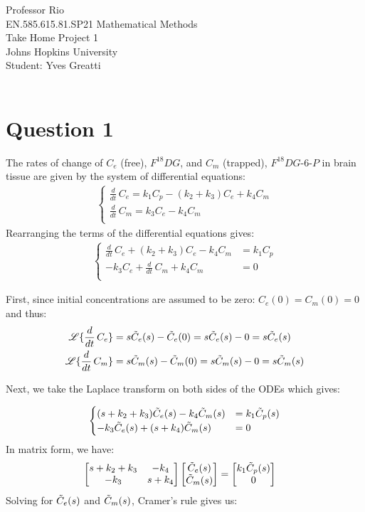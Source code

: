 \documentclass[12pt,twoside]{article}
\begin{document}
\noindent Professor Rio\\
EN.585.615.81.SP21 Mathematical Methods\\
Take Home Project 1\\
Johns Hopkins University\\
Student: Yves Greatti\\\

\section*{Question 1}

The rates of change of $C_e$ (free), $F^{18}DG$,  and $C_m$ (trapped), $F^{18}DG$-$6$-$P$
in brain tissue  are given by the system of differential equations:
\begin{align*}
	\begin{cases}
		\frac{d}{dt} \, C_e  = k_1 C_p - (k_2 + k_3) C_e + k_4 C_m \\
		\frac{d}{dt} \, C_m = k_3 C_e -  k_4 C_m \\
	\end{cases}
\end{align*}
Rearranging the terms of the differential equations gives:
\begin{align*}
	\begin{cases}
		\frac{d}{dt} \, C_e  + (k_2 + k_3) C_e - k_4 C_m  &= k_1 C_p \\
		- k_3 C_e + \frac{d}{dt} \, C_m + k_4 C_m  &= 0\\
	\end{cases}
\end{align*}

First, since initial concentrations are assumed to be zero: $C_e(0) = C_m(0) = 0$ and thus:
\begin{align*}
\mathscr{L}\{ \frac{d}{dt} \, C_e  \} &= s \tilde{ C }_e(s) - \tilde{ C }_e(0) = s \tilde{ C }_e(s) - 0 = s \tilde{ C }_e(s) \\
\mathscr{L}\{ \frac{d}{dt} \, C_m  \} &= s \tilde{ C }_m(s) - \tilde{ C }_m(0) = s \tilde{ C }_m(s) - 0 = s \tilde{ C }_m(s) \\
\end{align*}

Next, we take the Laplace transform on both sides of the ODEs which gives:

\begin{align*}
	\begin{cases}
		(s + k_2 + k_3)  \tilde{ C }_e(s)  - k_4 \tilde{ C }_m(s) &= k_1 \tilde{ C }_p(s) \\
		-k_3  \tilde{ C }_e(s)  + (s + k_4) \tilde{ C }_m(s) &=  0
	\end{cases}
\end{align*}
 In matrix form, we have:
\begin{align*}
 \begin{bmatrix} s + k_2 + k_3 & -k_4 \\ -k_3 & s + k_4 \end{bmatrix} \begin{bmatrix}  \tilde{ C }_e(s) \\  \tilde{ C }_m(s) \end{bmatrix} &= \begin{bmatrix} k_1 \tilde{ C }_p(s)  \\ 0 \end{bmatrix}
\end{align*}
Solving for $\tilde{ C }_e(s)$ and $\tilde{ C }_m(s)$, Cramer's rule gives us:
\end{document}
